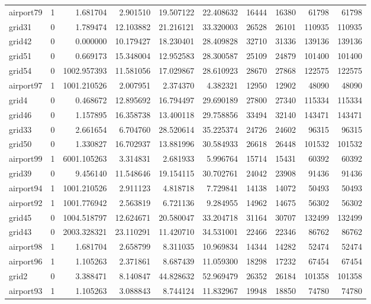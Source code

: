 \begin{longtable}{|l|r|r|r|r|r|r|r|r|r|}
airport79 & 1 & 1.681704 & 2.901510 & 19.507122 & 22.408632 & 16444 & 16380 & 61798 & 61798 \\
grid31 & 0 & 1.789474 & 12.103882 & 21.216121 & 33.320003 & 26528 & 26101 & 110935 & 110935 \\
grid42 & 0 & 0.000000 & 10.179427 & 18.230401 & 28.409828 & 32710 & 31336 & 139136 & 139136 \\
grid51 & 0 & 0.669173 & 15.348004 & 12.952583 & 28.300587 & 25109 & 24879 & 101400 & 101400 \\
grid54 & 0 & 1002.957393 & 11.581056 & 17.029867 & 28.610923 & 28670 & 27868 & 122575 & 122575 \\
airport97 & 1 & 1001.210526 & 2.007951 & 2.374370 & 4.382321 & 12950 & 12902 & 48090 & 48090 \\
grid4 & 0 & 0.468672 & 12.895692 & 16.794497 & 29.690189 & 27800 & 27340 & 115334 & 115334 \\
grid46 & 0 & 1.157895 & 16.358738 & 13.400118 & 29.758856 & 33494 & 32140 & 143471 & 143471 \\
grid33 & 0 & 2.661654 & 6.704760 & 28.520614 & 35.225374 & 24726 & 24602 & 96315 & 96315 \\
grid50 & 0 & 1.330827 & 16.702937 & 13.881996 & 30.584933 & 26618 & 26448 & 101532 & 101532 \\
airport99 & 1 & 6001.105263 & 3.314831 & 2.681933 & 5.996764 & 15714 & 15431 & 60392 & 60392 \\
grid39 & 0 & 9.456140 & 11.548646 & 19.154115 & 30.702761 & 24042 & 23908 & 91436 & 91436 \\
airport94 & 1 & 1001.210526 & 2.911123 & 4.818718 & 7.729841 & 14138 & 14072 & 50493 & 50493 \\
airport92 & 1 & 1001.776942 & 2.563819 & 6.721136 & 9.284955 & 14962 & 14675 & 56302 & 56302 \\
grid45 & 0 & 1004.518797 & 12.624671 & 20.580047 & 33.204718 & 31164 & 30707 & 132499 & 132499 \\
grid43 & 0 & 2003.328321 & 23.110291 & 11.420710 & 34.531001 & 22466 & 22346 & 86762 & 86762 \\
airport98 & 1 & 1.681704 & 2.658799 & 8.311035 & 10.969834 & 14344 & 14282 & 52474 & 52474 \\
airport96 & 1 & 1.105263 & 2.371861 & 8.687439 & 11.059300 & 18298 & 17232 & 67454 & 67454 \\
grid2 & 0 & 3.388471 & 8.140847 & 44.828632 & 52.969479 & 26352 & 26184 & 101358 & 101358 \\
airport93 & 1 & 1.105263 & 3.088843 & 8.744124 & 11.832967 & 19948 & 18850 & 74780 & 74780 \\

\end{longtable}
